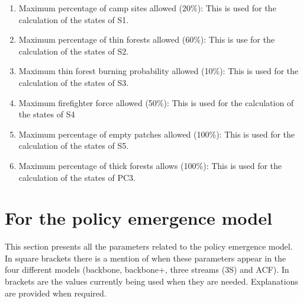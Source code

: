 \begin{enumerate}
\item Maximum percentage of camp sites allowed (20\%): This is used for the calculation of the states of S1.
\item Maximum percentage of thin forests allowed (60\%): This is use for the calculation of the states of S2.
\item Maximum thin forest burning probability allowed (10\%): This is used for the calculation of the states of S3.
\item Maximum firefighter force allowed (50\%): This is used for the calculation of the states of S4
\item Maximum percentage of empty patches allowed (100\%): This is used for the calculation of the states of S5.
\item Maximum percentage of thick forests allows (100\%): This is used for the calculation of the states of PC3.
\end{enumerate}

\section{For the policy emergence model}

This section presents all the parameters related to the policy emergence model. In square brackets there is a mention of when these parameters appear in the four different models (backbone, backbone+, three streams (3S) and ACF). In brackets are the values currently being used when they are needed. Explanations are provided when required.

